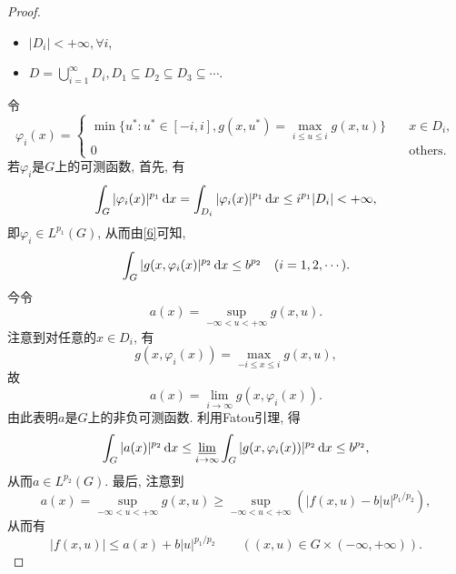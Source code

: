 \begin{proposition}
\begin{proof}
        \begin{itemize}
            \item $|D_i| < +\infty, \forall i$, 
            \item $D = \bigcup_{i = 1}^{\infty}D_i, D_1 \subseteq D_2 \subseteq D_3 \subseteq \cdots$.
        \end{itemize}
        令 
        \begin{equation*}
            \varphi_i(x) = 
            \begin{cases}
                \min\{u^*\colon u^* \in [-i, i], g(x, u^*) = \max_{i \leq u \leq i}g(x, u)\} \quad &x \in D_i, \\ 
                0 \quad &\text{others}.
            \end{cases}
        \end{equation*}
        若$\varphi_i$是$G$上的可测函数, 首先, 有 
        \begin{equation*}
            \int_G|\varphi_i(x)|^{p_1}\,{\rm d}x = \int_{D_i}|\varphi_i(x)|^{p_1}\,{\rm d}x \leq i^{p_1}|D_i| < +\infty,
        \end{equation*}
        即$\varphi_i \in L^{p_1}(G)$, 从而由\eqref{6}可知, 
        \begin{equation*}
            \int_G|g(x, \varphi_i(x)|^{p_2} \,{\rm d}x \leq b^{p_2} \quad (i = 1, 2, \cdots).
        \end{equation*}
        今令 
        \begin{equation*}
            a(x) = \sup_{-\infty < u < +\infty} g(x, u).
        \end{equation*}
        注意到对任意的$x \in D_i$, 有 
        \begin{equation*}
            g(x, \varphi_i(x)) = \max_{-i \leq x \leq i}g(x, u),
        \end{equation*}
        故 
        \begin{equation*}
            a(x) = \lim\limits_{i \rightarrow \infty}g(x, \varphi_i(x)).
        \end{equation*}
        由此表明$a$是$G$上的非负可测函数. 利用Fatou引理, 得 
        \begin{equation*}
            \int_G|a(x)|^{p_2} \,{\rm d}x \leq \varliminf\limits_{i \rightarrow \infty}\int_G|g(x, \varphi_i(x))|^{p_2} \,{\rm d}x \leq b^{p_2},
        \end{equation*}
        从而$a \in L^{p_2}(G)$. 最后, 注意到 
        \begin{equation*}
            a(x) = \sup_{-\infty < u < +\infty} g(x, u) \geq \sup_{-\infty < u < +\infty}(|f(x, u) - b|u|^{p_1/p_2}),
        \end{equation*}
        从而有 
        \begin{equation*}
            |f(x, u)| \leq a(x) + b|u|^{p_1/p_2} \qquad ((x, u) \in G \times (-\infty, +\infty)).
        \end{equation*}


\end{proof}
\end{proposition}
